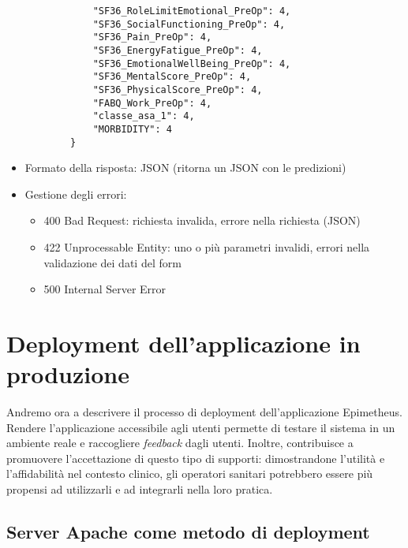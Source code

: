\begin{itemize}
\begin{verbatim}
            "SF36_RoleLimitEmotional_PreOp": 4,
            "SF36_SocialFunctioning_PreOp": 4,
            "SF36_Pain_PreOp": 4,
            "SF36_EnergyFatigue_PreOp": 4,
            "SF36_EmotionalWellBeing_PreOp": 4,
            "SF36_MentalScore_PreOp": 4,
            "SF36_PhysicalScore_PreOp": 4,
            "FABQ_Work_PreOp": 4,
            "classe_asa_1": 4,
            "MORBIDITY": 4
        }
    \end{verbatim}
  \item Formato della risposta: JSON (ritorna un JSON con le predizioni)
  \item Gestione degli errori:
      \begin{itemize}
        \item 400 Bad Request: richiesta invalida, errore nella richiesta (JSON)
        \item 422 Unprocessable Entity: uno o più parametri invalidi, errori nella validazione dei dati del form
        \item 500 Internal Server Error
    \end{itemize}
\end{itemize}


\section{Deployment dell'applicazione in produzione}
\label{sec:deploy}

Andremo ora a descrivere il processo di deployment dell'applicazione Epimetheus.
\newline
Rendere l’applicazione accessibile agli utenti permette di testare il sistema in un ambiente reale e raccogliere \textit{feedback} dagli utenti.
\newline
Inoltre,  contribuisce a promuovere l'accettazione di questo tipo di supporti: dimostrandone l'utilità e l'affidabilità nel contesto clinico, gli operatori sanitari potrebbero essere più propensi ad utilizzarli e ad integrarli nella loro pratica.

\subsection{Server Apache come metodo di deployment}

